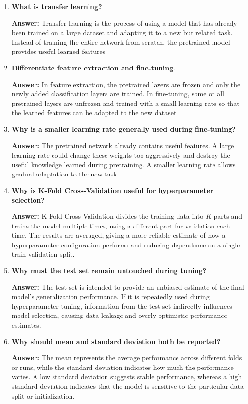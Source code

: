 \documentclass[10pt]{article}
\begin{document}
\begin{enumerate}
\item \textbf{What is transfer learning?}

\textbf{Answer:} Transfer learning is the process of using a model that has already been trained on a large dataset and adapting it to a new but related task. Instead of training the entire network from scratch, the pretrained model provides useful learned features.

\item \textbf{Differentiate feature extraction and fine-tuning.}

\textbf{Answer:} In feature extraction, the pretrained layers are frozen and only the newly added classification layers are trained. In fine-tuning, some or all pretrained layers are unfrozen and trained with a small learning rate so that the learned features can be adapted to the new dataset.

\item \textbf{Why is a smaller learning rate generally used during fine-tuning?}

\textbf{Answer:} The pretrained network already contains useful features. A large learning rate could change these weights too aggressively and destroy the useful knowledge learned during pretraining. A smaller learning rate allows gradual adaptation to the new task.

\item \textbf{Why is K-Fold Cross-Validation useful for hyperparameter selection?}

\textbf{Answer:} K-Fold Cross-Validation divides the training data into $K$ parts and trains the model multiple times, using a different part for validation each time. The results are averaged, giving a more reliable estimate of how a hyperparameter configuration performs and reducing dependence on a single train-validation split.

\item \textbf{Why must the test set remain untouched during tuning?}

\textbf{Answer:} The test set is intended to provide an unbiased estimate of the final model's generalization performance. If it is repeatedly used during hyperparameter tuning, information from the test set indirectly influences model selection, causing data leakage and overly optimistic performance estimates.

\item \textbf{Why should mean and standard deviation both be reported?}

\textbf{Answer:} The mean represents the average performance across different folds or runs, while the standard deviation indicates how much the performance varies. A low standard deviation suggests stable performance, whereas a high standard deviation indicates that the model is sensitive to the particular data split or initialization.


\end{enumerate}
\end{document}
